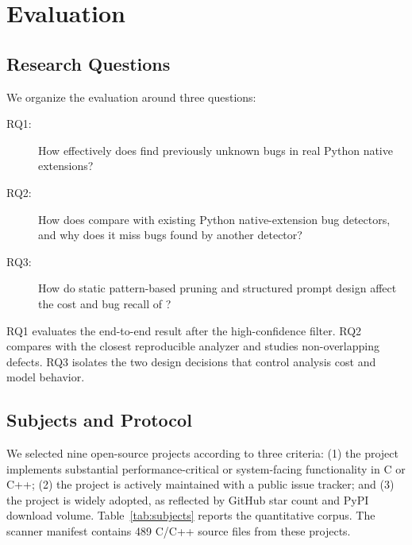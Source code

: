 \section{Evaluation}
\label{sec:evaluation}

\subsection{Research Questions}

We organize the evaluation around three questions:

\begin{description}
  \item[RQ1:] How effectively does \tool find previously unknown bugs in real
  Python native extensions?
  \item[RQ2:] How does \tool compare with existing Python native-extension bug
  detectors, and why does it miss bugs found by another detector?
  \item[RQ3:] How do static pattern-based pruning and structured prompt
  design affect the cost and bug recall of \tool?
\end{description}

RQ1 evaluates the end-to-end result after the high-confidence filter. RQ2
compares with the closest reproducible analyzer and studies non-overlapping
defects. RQ3 isolates the two design decisions that control analysis cost and
model behavior.

\subsection{Subjects and Protocol}

We selected nine open-source projects according to three criteria:
(1) the project implements substantial performance-critical or system-facing
functionality in C or C++; (2) the project is actively maintained with a
public issue tracker; and (3) the project is widely adopted, as reflected
by GitHub star count and PyPI download volume. Table~\ref{tab:subjects} reports the quantitative
corpus. The scanner manifest contains 489 C/C++ source files from these
projects.


